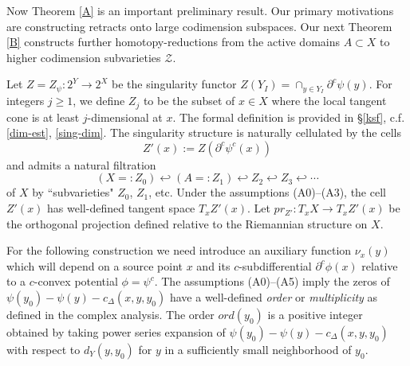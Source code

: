\documentclass[12pt]{amsart}
\theoremstyle{definition}
\theoremstyle{remark}
\newcommand{\del}{\partial}
\newcommand{\ysub}{\del^c \psi(y)}
\newcommand{\hh}{\hookleftarrow}
\newcommand{\sZ}{\mathscr{Z}}
\newcommand{\cd}{c_\Delta}
\begin{document}
Now Theorem \ref{A} is an important preliminary result. Our primary motivations are constructing retracts onto large codimension subspaces. Our next Theorem \ref{B} constructs further homotopy-reductions from the active domains $A\subset X$ to higher codimension subvarieties $\sZ$.



Let $Z=Z_{\psi}: 2^Y \to 2^X$ be the singularity functor $Z(Y_I)=\cap_{y\in Y_I} \ysub$. For integers $j\geq 1$, we define $Z_j$ to be the subset of $x\in X$ where the local tangent cone is at least $j$-dimensional at $x$. The formal definition is provided in \S \ref{ksf}, c.f. \ref{dim-est}, \ref{sing-dim}. The singularity structure is naturally cellulated by the cells $$Z'(x):=Z(\del^c\psi^c(x))$$ and admits a natural filtration $$(X=:Z_0)\hh (A=:Z_1) \hh Z_2 \hh Z_3 \hh \cdots $$ of $X$ by ``subvarieties" $Z_0$, $Z_1$, etc. Under the assumptions (A0)--(A3), the cell $Z'(x)$ has well-defined tangent space $T_x Z'(x)$. Let $pr_{Z'}: T_x X \to T_x Z'(x)$ be the orthogonal projection defined relative to the Riemannian structure on $X$.  


For the following construction we need introduce an auxiliary function $\nu_x(y)$ which will depend on a source point $x$ and its $c$-subdifferential $\del^c \phi(x)$ relative to a $c$-convex potential $\phi=\psi^c$. The assumptions (A0)--(A5) imply the zeros of $\psi(y_0)-\psi(y) -\cd(x,y,y_0)$ have a well-defined \emph{order} or \emph{multiplicity} as defined in the complex analysis. The order $ord(y_0)$ is a positive integer obtained by taking power series expansion of $\psi(y_0)-\psi(y) -\cd(x,y,y_0)$ with respect to $d_Y(y,y_0)$ for $y$ in a sufficiently small neighborhood of $y_0$. 
\end{document}
